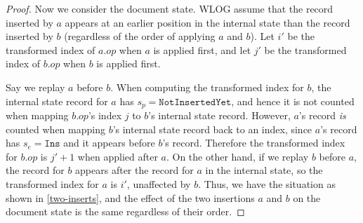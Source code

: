 \documentclass[sigplan,10pt]{acmart}
\begin{document}
\begin{proof}
  Now we consider the document state.
  WLOG assume that the record inserted by $a$ appears at an earlier position in the internal state than the record inserted by $b$ (regardless of the order of applying $a$ and $b$).
  Let $i'$ be the transformed index of $a.\mathit{op}$ when $a$ is applied first, and let $j'$ be the transformed index of $b.\mathit{op}$ when $b$ is applied first.

  Say we replay $a$ before $b$.
  When computing the transformed index for $b$, the internal state record for $a$ has $s_p = \texttt{NotInsertedYet}$, and hence it is not counted when mapping $b.\mathit{op}$'s index $j$ to $b$'s internal state record.
  However, $a$'s record \emph{is} counted when mapping $b$'s internal state record back to an index, since $a$'s record has $s_e = \texttt{Ins}$ and it appears before $b$'s record.
  Therefore the transformed index for $b.\mathit{op}$ is $j' + 1$ when applied after $a$.
  On the other hand, if we replay $b$ before $a$, the record for $b$ appears after the record for $a$ in the internal state, so the transformed index for $a$ is $i'$, unaffected by $b$.
  Thus, we have the situation as shown in \autoref{two-inserts}, and the effect of the two insertions $a$ and $b$ on the document state is the same regardless of their order.
\end{proof}
\end{document}
